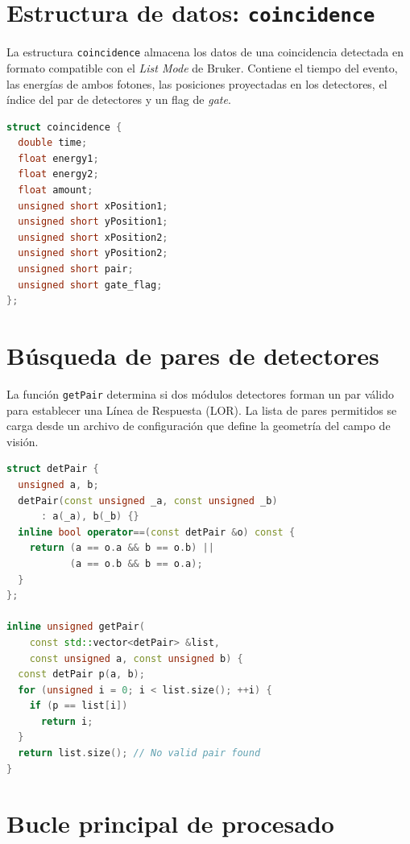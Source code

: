 \section{Estructura de datos: \texttt{coincidence}}

La estructura \texttt{coincidence} almacena los datos de una coincidencia detectada en formato compatible con el \emph{List Mode} de Bruker. Contiene el tiempo del evento, las energías de ambos fotones, las posiciones proyectadas en los detectores, el índice del par de detectores y un flag de \emph{gate}.

\begin{lstlisting}[language=C++, caption={Estructura de datos \texttt{coincidence} para la escritura en formato \emph{List Mode}.}, label={lst:coincidence_struct_annex}]
struct coincidence {
  double time;
  float energy1;
  float energy2;
  float amount;
  unsigned short xPosition1;
  unsigned short yPosition1;
  unsigned short xPosition2;
  unsigned short yPosition2;
  unsigned short pair;
  unsigned short gate_flag;
};
\end{lstlisting}


\section{Búsqueda de pares de detectores}

La función \texttt{getPair} determina si dos módulos detectores forman un par válido para establecer una Línea de Respuesta (LOR). La lista de pares permitidos se carga desde un archivo de configuración que define la geometría del campo de visión.

\begin{lstlisting}[language=C++, caption={Función de búsqueda de pares de detectores válidos.}, label={lst:getpair_annex}]
struct detPair {
  unsigned a, b;
  detPair(const unsigned _a, const unsigned _b)
      : a(_a), b(_b) {}
  inline bool operator==(const detPair &o) const {
    return (a == o.a && b == o.b) ||
           (a == o.b && b == o.a);
  }
};

inline unsigned getPair(
    const std::vector<detPair> &list,
    const unsigned a, const unsigned b) {
  const detPair p(a, b);
  for (unsigned i = 0; i < list.size(); ++i) {
    if (p == list[i])
      return i;
  }
  return list.size(); // No valid pair found
}
\end{lstlisting}

\section{Bucle principal de procesado}

